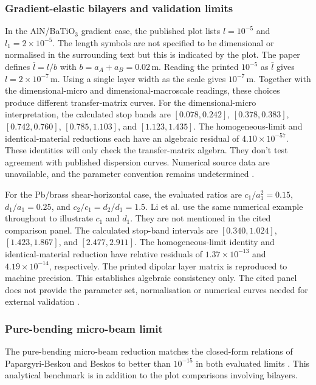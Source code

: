 \subsubsection{Gradient-elastic bilayers and validation limits}
In the AlN/BaTiO$_3$ gradient case, the published plot lists $l=10^{-5}$ and $l_1=2\times10^{-5}$.  The length symbols are not specified to be dimensional or normalised in the surrounding text but this is indicated by the plot. The paper defines $\bar l=l/b$ with $b=a_A+a_B=0.02\,\mathrm{m}$. Reading the printed $10^{-5}$ as $\bar l$ gives $l=2\times10^{-7}\,\mathrm{m}$. Using a single layer width as the scale gives $10^{-7}\,\mathrm{m}$. Together with the dimensional-micro and dimensional-macroscale readings, these choices produce different transfer-matrix curves. For the dimensional-micro interpretation, the calculated stop bands are $[0.078,0.242]$, $[0.378,0.383]$, $[0.742,0.760]$, $[0.785,1.103]$, and $[1.123,1.435]$. The homogeneous-limit and identical-material reductions each have an algebraic residual of $4.10\times10^{-57}$. These identities will only check the transfer-matrix algebra. They don't test agreement with published dispersion curves. Numerical source data are unavailable, and the parameter convention remains undetermined \cite{li2024anchorB}.

For the Pb/brass shear-horizontal case, the evaluated ratios are $c_1/a_1^2=0.15$, $d_1/a_1=0.25$, and $c_2/c_1=d_2/d_1=1.5$. Li et al. use the same numerical example throughout to illustrate $c_1$ and $d_1$. They are not mentioned in the cited comparison panel. The calculated stop-band intervals are $[0.340,1.024]$, $[1.423,1.867]$, and $[2.477,2.911]$. The homogeneous-limit identity and identical-material reduction have relative residuals of $1.37\times10^{-13}$ and $4.19\times10^{-14}$, respectively. The printed dipolar layer matrix is reproduced to machine precision. This establishes algebraic consistency only. The cited panel does not provide the parameter set, normalisation or numerical curves needed for external validation \cite{li2023anchorA,liweizhou2016}.

\subsubsection{Pure-bending micro-beam limit}
The pure-bending micro-beam reduction matches the closed-form relations of Papargyri-Beskou and Beskos to better than $10^{-15}$ in both evaluated limits \cite{papargyribeskou2009}. This analytical benchmark is in addition to the plot comparisons involving bilayers.

